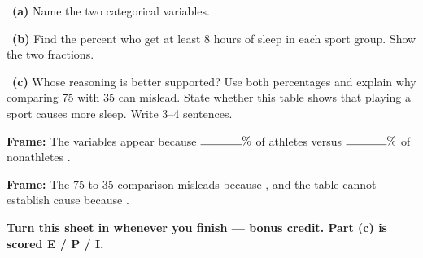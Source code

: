 \documentclass[11pt]{article}
\begin{document}
~\textbf{(a)} Name the two categorical variables.\par
\workspace{0.7in}

~\textbf{(b)} Find the percent who get at least 8 hours of sleep in each sport group. Show the two fractions.\par
\workspace{1.4in}

~\textbf{(c)} Whose reasoning is better supported? Use both percentages and explain why comparing 75 with 35 can mislead. State whether this table shows that playing a sport causes more sleep. Write 3--4 sentences.\par
\workspace{2.0in}

\begin{sentenceframebox}\raggedright\textbf{Frame:} The variables appear \blank[0.8in] because $\blank[0.5in]\%$ of athletes versus $\blank[0.5in]\%$ of nonathletes \blank[1.7in].\end{sentenceframebox}

\begin{sentenceframebox}\raggedright\textbf{Frame:} The 75-to-35 comparison misleads because \blank[2.0in], and the table cannot establish cause because \blank[2.0in].\end{sentenceframebox}

\textbf{Turn this sheet in whenever you finish --- bonus credit. Part (c) is scored E / P / I.}\par
\end{document}
